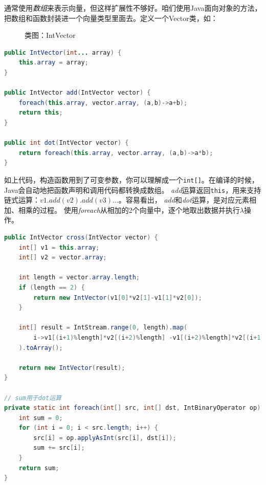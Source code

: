 \noindent
通常使用\emph{数组}来表示向量，但这样扩展性不够好。咱们使用Java面向对象的方法，把数组和函数封装进一个向量类型里面去。定义一个Vector类，如：

\begin{figure}[!htb]
\begin{center}\end{center}
\caption{类图：IntVector}
\label{fig:part2_math_vector}
\end{figure}

\begin{lstlisting}[language=Java]
public IntVector(int... array) {
    this.array = array;
}

public IntVector add(IntVector vector) {
    foreach(this.array, vector.array, (a,b)->a+b);
    return this;
}

public int dot(IntVector vector) {
    return foreach(this.array, vector.array, (a,b)->a*b);
}
\end{lstlisting}

如上代码，构造函数用到了可变参数，你可以理解成一个\lstinline{int[]}。在编译的时候，Java会自动地把函数声明和调用代码都转换成数组。
\emph{add}运算返回\lstinline{this}，用来支持链式运算：$v1.add(v2).add(v3)\dots$。容易看出，
\emph{add}和\emph{dot}运算，是对应元素相加、相乘的过程。
使用\emph{foreach}从相加的2个向量中，逐个地取出数据并执行$\lambda$操作。

\begin{lstlisting}[language=Java,caption=叉乘运算]
public IntVector cross(IntVector vector) {
    int[] v1 = this.array;
    int[] v2 = vector.array;

    int length = vector.array.length;
    if (length == 2) {
        return new IntVector(v1[0]*v2[1]-v1[1]*v2[0]);
    }

    int[] result = IntStream.range(0, length).map(
        i->v1[(i+1)%length]*v2[(i+2)%length] -v1[(i+2)%length]*v2[(i+1)%length]
    ).toArray();

    return new IntVector(result);
}

// sum用于dot运算
private static int foreach(int[] src, int[] dst, IntBinaryOperator op) {
    int sum = 0;
    for (int i = 0; i < src.length; i++) {
        src[i] = op.applyAsInt(src[i], dst[i]);
        sum += src[i];
    }
    return sum;
}
\end{lstlisting}

